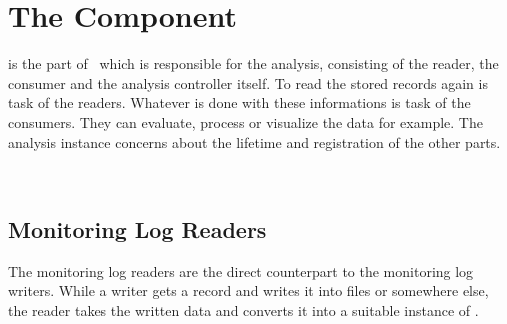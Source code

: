 % 


\chapter{The \KiekerAnalysisPart{} Component}\label{chap:componentsAnalysis}
	

	\class{\KiekerAnalysisPart} is the part of \Kieker\  which is responsible for the analysis, consisting of the reader, the consumer and the analysis controller itself. To read the stored records again is task of the readers. Whatever is done with these informations is task of the consumers. They can evaluate, process or visualize the data for example. The analysis instance concerns about the lifetime and registration of the other parts.

\


\section{Monitoring Log Readers}\label{sec:analysis:writer}

		The monitoring log readers are the direct counterpart to the monitoring log writers. While a writer gets a record and writes it into files or somewhere else, the reader takes the written data and converts it into a suitable instance of .

\


